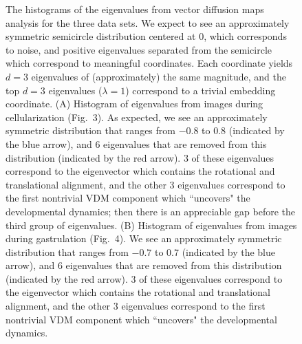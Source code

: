 \documentclass{pnastwo}
\newcommand{\fig}[0]{Fig.}
\begin{document}
\begin{figure}
\caption{The histograms of the eigenvalues from vector diffusion maps analysis for the three data sets.
%
We expect to see an approximately symmetric semicircle distribution centered at 0, which corresponds to noise, and positive eigenvalues separated from the semicircle which correspond to meaningful coordinates.
%
Each coordinate yields $d=3$ eigenvalues of (approximately) the same magnitude, and the top $d=3$ eigenvalues ($\lambda=1$) correspond to a trivial embedding coordinate.
%
(A) Histogram of eigenvalues from images during cellularization (\fig~3). As expected, we see an approximately symmetric distribution that ranges from $-0.8$ to $0.8$ (indicated by the blue arrow), and $6$ eigenvalues that are removed from this distribution (indicated by the red arrow). $3$ of these eigenvalues correspond to the eigenvector which contains the rotational and translational alignment, and the other $3$ eigenvalues correspond to the first nontrivial VDM component which ``uncovers" the developmental dynamics; then there is an appreciable gap before the third group of eigenvalues.
%
(B) Histogram of eigenvalues from images during gastrulation (\fig~4). We see an approximately symmetric distribution that ranges from $-0.7$ to $0.7$ (indicated by the blue arrow), and $6$ eigenvalues that are removed from this distribution (indicated by the red arrow). $3$ of these eigenvalues correspond to the eigenvector which contains the rotational and translational alignment, and the other $3$ eigenvalues correspond to the first nontrivial VDM component which ``uncovers" the developmental dynamics.
}
\end{figure}
\end{document}
